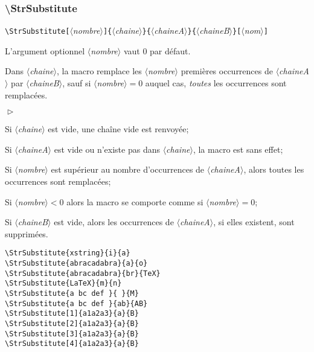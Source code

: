 \documentclass[a4paper,10pt]{article}
\newcommand\argu[1]{$\langle$\textit{#1}$\rangle$}
\newcommand\ARGU[1]{\texttt{\color{black}\{}\argu{#1}\texttt{\color{black}\}}}
\newcommand\arguC[1]{\texttt{\color{black}[}\argu{#1}\texttt{\color{black}]}}
\newenvironment{Conditions}[1][1cm]%
{\begin{list}%
	{$\vartriangleright$}%
	{\setlength{\leftmargin}{#1}
	 \setlength{\itemsep}{0pt}
	 \setlength{\parsep}{0pt}
	 \setlength{\topsep}{2ptplus3ptminus2pt}
	}}%
{\end{list}}
\newcommand\styleexemple{\small\vskip4pt}
\newcommand\verbinline{\lstinline[basicstyle=\normalsize\ttfamily]}
\begin{document}
\subsubsection{\ttfamily\textbackslash StrSubstitute}
\verbinline|\StrSubstitute|\arguC{nombre}\ARGU{chaine}\ARGU{chaineA}\ARGU{chaineB}\arguC{nom}
\smallskip

L'argument optionnel \argu{nombre} vaut 0 par défaut.\par\nobreak\smallskip
Dans \argu{chaine}, la macro remplace les \argu{nombre} premières occurrences de \argu{chaineA} par \argu{chaineB}, sauf si \argu{nombre}${}=0$ auquel cas, \emph{toutes} les occurrences sont remplacées.

\begin{Conditions}
	\item Si \argu{chaine} est vide, une chaîne vide est renvoyée;
	\item Si \argu{chaineA} est vide ou n'existe pas dans \argu{chaine}, la macro est sans effet;
	\item Si \argu{nombre} est supérieur au nombre d'occurrences de \argu{chaineA}, alors toutes les occurrences sont remplacées;
	\item Si \argu{nombre}${}<0$ alors la macro se comporte comme si \argu{nombre}${}=0$;
	\item Si \argu{chaineB} est vide, alors les occurrences de \argu{chaineA}, si elles existent, sont supprimées.
\end{Conditions}

\begin{minipage}[t]{0.65\linewidth}
\begin{lstlisting}
\StrSubstitute{xstring}{i}{a}
\StrSubstitute{abracadabra}{a}{o}
\StrSubstitute{abracadabra}{br}{TeX}
\StrSubstitute{LaTeX}{m}{n}
\StrSubstitute{a bc def }{ }{M}
\StrSubstitute{a bc def }{ab}{AB}
\StrSubstitute[1]{a1a2a3}{a}{B}
\StrSubstitute[2]{a1a2a3}{a}{B}
\StrSubstitute[3]{a1a2a3}{a}{B}
\StrSubstitute[4]{a1a2a3}{a}{B}
\end{lstlisting}%
\end{minipage}\hfill
\begin{minipage}[t]{0.35\linewidth}
	\styleexemple
	\par
	\par
	\par
	\par
	\par
	\par
	\par
	\par
	\par
\end{minipage}%
\end{document}
